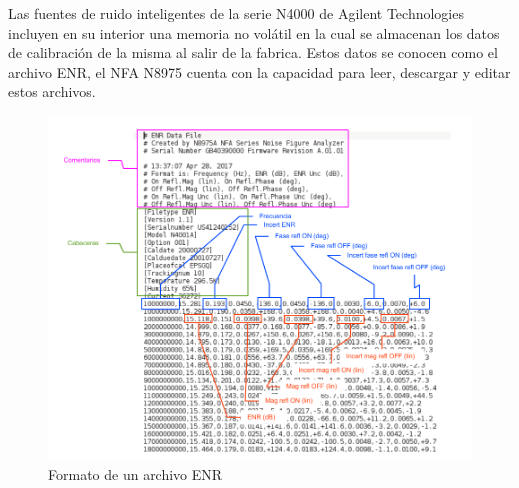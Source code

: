 \documentclass{article}
\begin{document}
	Las fuentes de ruido inteligentes de la serie N4000 de Agilent Technologies incluyen en su interior una memoria no volátil en la cual se almacenan los datos de calibración de la misma al salir de la fabrica. Estos datos se conocen como el archivo ENR, el NFA N8975 cuenta con la capacidad para leer, descargar y editar estos archivos. 
	
	\begin{figure}[h!]
		\centering
		\includegraphics[width=18cm]{Imagenes/FormatoArchivoENR.pdf}
		\caption{Formato de un archivo ENR}
		\label{Fig:FormatoArchivoENR}
	\end{figure}
\end{document}
